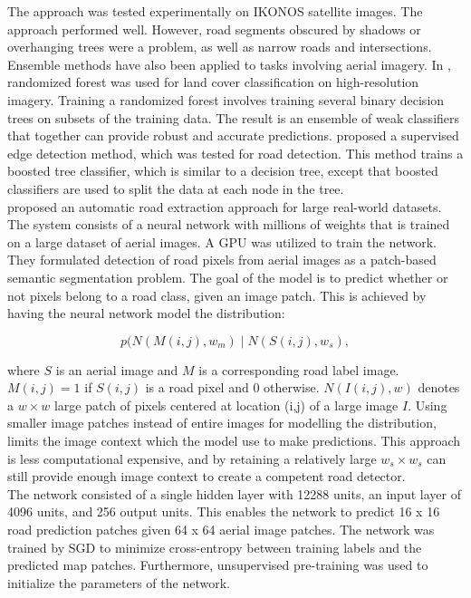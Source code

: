  The approach was tested experimentally on IKONOS satellite images. The approach performed well. However, road segments obscured by shadows or overhanging trees were a problem, as well as narrow roads and intersections.\\

Ensemble methods have also been applied to tasks involving aerial imagery. In \citep{Kluckner_semantic_height}, randomized forest was used for land cover classification on high-resolution imagery. Training a randomized forest involves training several binary decision trees on subsets of the training data. The result is an ensemble of weak classifiers that together can provide robust and accurate predictions. \cite{Dollar_supervised_edge} proposed a supervised edge detection method, which was tested for road detection. This method trains a boosted tree classifier, which is similar to a decision tree, except that boosted classifiers are used to split the data at each node in the tree.\\

\cite{Mnih_roads_high_res_aerial_images} proposed an automatic road extraction approach for large real-world datasets. The system consists of a neural network with millions of weights that is trained on a large dataset of aerial images. A \ac{GPU} was utilized to train the network.  \\

They formulated detection of road pixels from aerial images as a patch-based semantic segmentation problem. 
The goal of the model is to predict whether or not pixels belong to a road class, given an image patch. This is achieved by having the neural network model the distribution:

 $$p(N(M(i,j), w_m) \mid N(S(i,j), w_s),$$ 
 
\noindent where $S$ is an aerial image and $M$ is a corresponding road label image. $M(i,j) = 1$ if $S(i,j)$ is a road pixel and 0 otherwise.  $N(I(i,j), w)$  denotes a $w \times w$ large patch of pixels centered at location (i,j) of a large image $I$. Using smaller image patches instead of entire images for modelling the distribution, limits the image context which the model use to make predictions. This approach is less computational expensive, and by retaining a relatively large $w_s \times w_s$ can still provide enough image context to create a competent road detector. \\

The network consisted of a single hidden layer with 12288 units, an input layer of 4096 units, and 256 output units. This enables the network to predict 16 x 16 road prediction patches given 64 x 64 aerial image patches. The network was trained by \ac{SGD} to minimize cross-entropy between training labels and the predicted map patches. Furthermore, unsupervised pre-training was used to initialize the parameters of the network.\\

